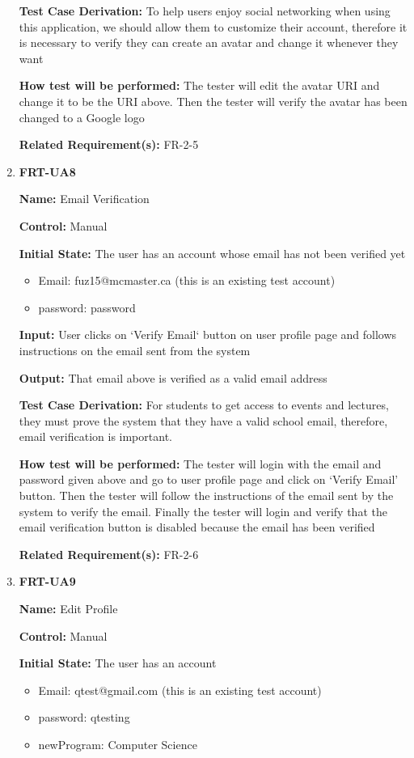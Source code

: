 \documentclass[12pt, titlepage]{article}
\begin{document}
\begin{enumerate}
\textbf{Test Case Derivation:} To help users enjoy social networking when using this application, we should allow them to customize their account, therefore it is necessary to verify they can create an avatar and change it whenever they want
					
\textbf{How test will be performed:} The tester will edit the avatar URI and change it to be the URI above. Then the tester will verify the avatar has been changed to a Google logo

\textbf{Related Requirement(s):} FR-2-5

\item{\textbf{FRT-UA8}}

\textbf{Name:} Email Verification

\textbf{Control:} Manual
					
\textbf{Initial State:} The user has an account whose email has not been verified yet
\begin{itemize}
\item Email: fuz15@mcmaster.ca (this is an existing test account)
\item password: password
\end{itemize}

\textbf{Input:} User clicks on `Verify Email` button on user profile page and follows instructions on the email sent from the system
					
\textbf{Output:} That email above is verified as a valid email address

\textbf{Test Case Derivation:} For students to get access to events and lectures, they must prove the system that they have a valid school email, therefore, email verification is important.
					
\textbf{How test will be performed:} The tester will login with the email and password given above and go to user profile page and click on `Verify Email' button. Then the tester will follow the instructions of the email sent by the system to verify the email. Finally the tester will login and verify that the email verification button is disabled because the email has been verified

\textbf{Related Requirement(s):} FR-2-6

\item{\textbf{FRT-UA9}}

\textbf{Name:} Edit Profile

\textbf{Control:} Manual
					
\textbf{Initial State:} The user has an account 
\begin{itemize}
\item Email: qtest@gmail.com (this is an existing test account)
\item password: qtesting
\item newProgram: Computer Science
\end{itemize}


\end{enumerate}
\end{document}
